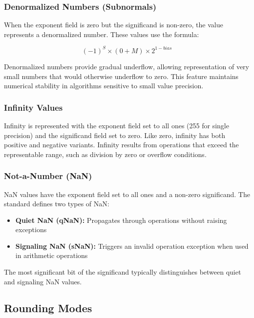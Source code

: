 \subsubsection{Denormalized Numbers (Subnormals)}
\label{subsubsec:denormalized}

When the exponent field is zero but the significand is non-zero, the value represents a denormalized number. These values use the formula:

$$(-1)^S \times (0 + M) \times 2^{1-bias}$$

Denormalized numbers provide gradual underflow, allowing representation of very small numbers that would otherwise underflow to zero. This feature maintains numerical stability in algorithms sensitive to small value precision.

\subsubsection{Infinity Values}
\label{subsubsec:infinity}

Infinity is represented with the exponent field set to all ones (255 for single precision) and the significand field set to zero. Like zero, infinity has both positive and negative variants. Infinity results from operations that exceed the representable range, such as division by zero or overflow conditions.

\subsubsection{Not-a-Number (NaN)}
\label{subsubsec:nan}

NaN values have the exponent field set to all ones and a non-zero significand. The standard defines two types of NaN:

\begin{itemize}
\item \textbf{Quiet NaN (qNaN):} Propagates through operations without raising exceptions
\item \textbf{Signaling NaN (sNaN):} Triggers an invalid operation exception when used in arithmetic operations
\end{itemize}

The most significant bit of the significand typically distinguishes between quiet and signaling NaN values.

\subsection{Rounding Modes}
\label{subsec:ieee754_rounding}

